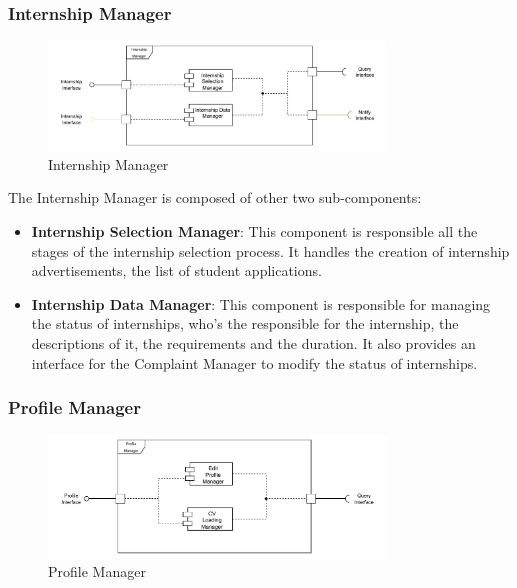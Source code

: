 \subsubsection{Internship Manager}
\label{subsub:internship-manager}

\begin{figure}[H]
      \centering
      \includegraphics[width=0.8\textwidth]{Images/Internship_Architecture.pdf}
      \caption{Internship Manager}
      \label{internship-manager-arch}
\end{figure}

\par The Internship Manager is composed of other two sub-components:
\begin{itemize}
      \item \textbf{Internship Selection Manager}: This component is responsible all the stages of the internship selection process.
            It handles the creation of internship advertisements, the list of student applications.
      \item \textbf{Internship Data Manager}: This component is responsible for managing the status of internships,
            who's the responsible for the internship, the descriptions of it, the requirements and the duration.
            It also provides an interface for the Complaint Manager to modify the status of internships. 
\end{itemize}

\subsubsection{Profile Manager}
\label{subsub:profile-manager}

\begin{figure}[H]
      \centering
      \includegraphics[width=0.8\textwidth]{Images/Profile_Architecture.pdf}
      \caption{Profile Manager}
      \label{profile-manager-arch}
\end{figure}

